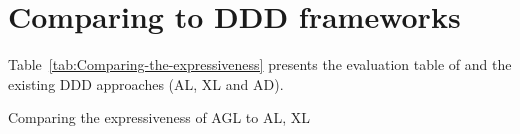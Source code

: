 \section{Comparing to DDD frameworks} \label{apex:compareAGLwithOther}


Table~\ref{tab:Comparing-the-expressiveness} presents the evaluation table of \agldcsl and the existing DDD approaches (AL, XL and AD). 


\begin{minipage}{\textwidth}
	\centering
	\caption{Comparing the expressiveness of AGL to AL, XL} \label{tab:Comparing-the-expressiveness}
	

\end{minipage}
